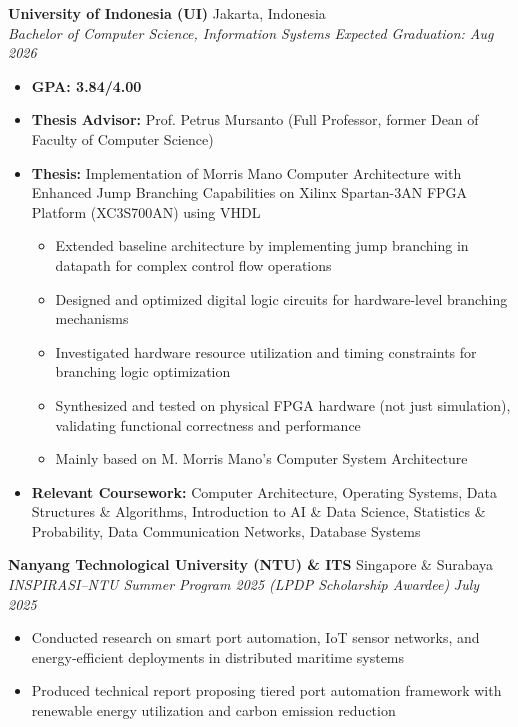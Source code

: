 \documentclass[10pt,a4paper]{article}
\newcommand{\experienceheader}[4]{
    \textbf{#1} \hfill #2 \\
    \textit{#3} \hfill \textit{#4}
}
\begin{document}
\experienceheader{University of Indonesia (UI)}{Jakarta, Indonesia}{Bachelor of Computer Science, Information Systems}{Expected Graduation: Aug 2026}
\begin{itemize}[leftmargin=*, itemsep=1pt, topsep=1pt]
    \item \textbf{GPA: 3.84/4.00}
    \item \textbf{Thesis Advisor:} Prof. Petrus Mursanto (Full Professor, former Dean of Faculty of Computer Science)
    \item \textbf{Thesis:} Implementation of Morris Mano Computer Architecture with Enhanced Jump Branching Capabilities on Xilinx Spartan-3AN FPGA Platform (XC3S700AN) using VHDL
    \begin{itemize}[leftmargin=*, itemsep=0.5pt, topsep=0.5pt]
        \item Extended baseline architecture by implementing jump branching in datapath for complex control flow operations
        \item Designed and optimized digital logic circuits for hardware-level branching mechanisms
        \item Investigated hardware resource utilization and timing constraints for branching logic optimization
        \item Synthesized and tested on physical FPGA hardware (not just simulation), validating functional correctness and performance
        \item Mainly based on M. Morris Mano's Computer System Architecture
    \end{itemize}
    \item \textbf{Relevant Coursework:} Computer Architecture, Operating Systems, Data Structures \& Algorithms, Introduction to AI \& Data Science, Statistics \& Probability, Data Communication Networks, Database Systems
\end{itemize}
\experienceheader{Nanyang Technological University (NTU) \& ITS}{Singapore \& Surabaya}{INSPIRASI–NTU Summer Program 2025 (LPDP Scholarship Awardee)}{July 2025}
\begin{itemize}[leftmargin=*, itemsep=1pt, topsep=1pt]
    \item Conducted research on smart port automation, IoT sensor networks, and energy-efficient deployments in distributed maritime systems
    \item Produced technical report proposing tiered port automation framework with renewable energy utilization and carbon emission reduction
\end{itemize}
\end{document}
